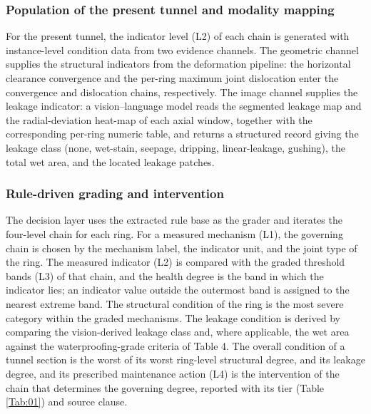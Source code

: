 \documentclass[preprint,12pt,authoryear]{elsarticle}
\begin{document}
\subsubsection{Population of the present tunnel and modality
mapping}\label{population-of-the-present-tunnel-and-modality-mapping}

For the present tunnel, the indicator level (L2) of each chain is
generated with instance-level condition data from two evidence channels.
The geometric channel supplies the structural indicators from the
deformation pipeline: the horizontal clearance convergence and the
per-ring maximum joint dislocation enter the convergence and dislocation
chains, respectively. The image channel supplies the leakage indicator:
a vision--language model reads the segmented leakage map and the
radial-deviation heat-map of each axial window, together with the
corresponding per-ring numeric table, and returns a structured record
giving the leakage class (none, wet-stain, seepage, dripping,
linear-leakage, gushing), the total wet area, and the located leakage
patches.

\subsubsection{Rule-driven grading and
intervention}\label{rule-driven-grading-and-intervention}

The decision layer uses the extracted rule base as the grader and
iterates the four-level chain for each ring. For a measured mechanism
(L1), the governing chain is chosen by the mechanism label, the
indicator unit, and the joint type of the ring. The measured indicator
(L2) is compared with the graded threshold bands (L3) of that chain, and
the health degree is the band in which the indicator lies; an indicator
value outside the outermost band is assigned to the nearest extreme
band. The structural condition of the ring is the most severe category
within the graded mechanisms. The leakage condition is derived by
comparing the vision-derived leakage class and, where applicable, the
wet area against the waterproofing-grade criteria of Table 4. The
overall condition of a tunnel section is the worst of its worst
ring-level structural degree, and its leakage degree, and its prescribed
maintenance action (L4) is the intervention of the chain that determines
the governing degree, reported with its tier (Table \ref{Tab:01}) and source
clause.
\end{document}
